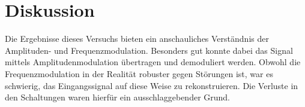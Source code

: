 \section{Diskussion}
\label{sec:diskussion}
Die Ergebnisse dieses Versuchs bieten ein anschauliches Verständnis
der Amplituden- und Frequenzmodulation. Besonders gut konnte dabei
das Signal mittels Amplitudenmodulation übertragen und demoduliert werden.
Obwohl die Frequenzmodulation in der Realität robuster gegen Störungen ist,
war es schwierig, das Eingangssignal auf diese Weise zu rekonstruieren.
Die Verluste in den Schaltungen waren hierfür ein ausschlaggebender Grund.
